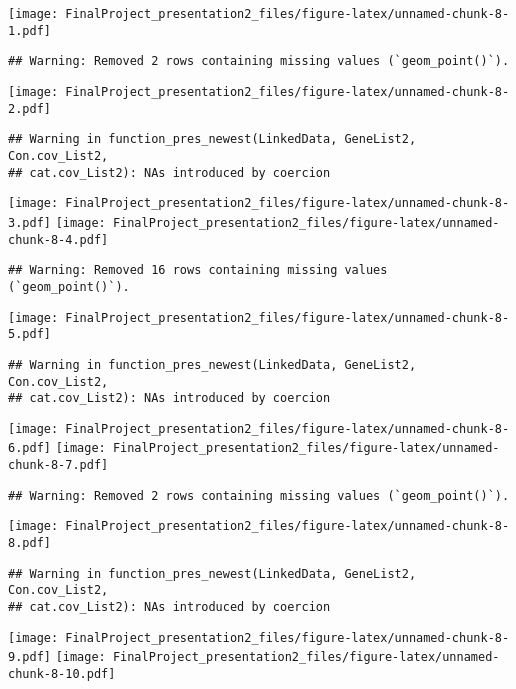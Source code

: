 \documentclass[
]{article}
\begin{document}
\texttt{[image: FinalProject\_presentation2\_files/figure-latex/unnamed-chunk-8-1.pdf]}

\begin{verbatim}
## Warning: Removed 2 rows containing missing values (`geom_point()`).
\end{verbatim}

\texttt{[image: FinalProject\_presentation2\_files/figure-latex/unnamed-chunk-8-2.pdf]}

\begin{verbatim}
## Warning in function_pres_newest(LinkedData, GeneList2, Con.cov_List2,
## cat.cov_List2): NAs introduced by coercion
\end{verbatim}

\texttt{[image: FinalProject\_presentation2\_files/figure-latex/unnamed-chunk-8-3.pdf]}
\texttt{[image: FinalProject\_presentation2\_files/figure-latex/unnamed-chunk-8-4.pdf]}

\begin{verbatim}
## Warning: Removed 16 rows containing missing values (`geom_point()`).
\end{verbatim}

\texttt{[image: FinalProject\_presentation2\_files/figure-latex/unnamed-chunk-8-5.pdf]}

\begin{verbatim}
## Warning in function_pres_newest(LinkedData, GeneList2, Con.cov_List2,
## cat.cov_List2): NAs introduced by coercion
\end{verbatim}

\texttt{[image: FinalProject\_presentation2\_files/figure-latex/unnamed-chunk-8-6.pdf]}
\texttt{[image: FinalProject\_presentation2\_files/figure-latex/unnamed-chunk-8-7.pdf]}

\begin{verbatim}
## Warning: Removed 2 rows containing missing values (`geom_point()`).
\end{verbatim}

\texttt{[image: FinalProject\_presentation2\_files/figure-latex/unnamed-chunk-8-8.pdf]}

\begin{verbatim}
## Warning in function_pres_newest(LinkedData, GeneList2, Con.cov_List2,
## cat.cov_List2): NAs introduced by coercion
\end{verbatim}

\texttt{[image: FinalProject\_presentation2\_files/figure-latex/unnamed-chunk-8-9.pdf]}
\texttt{[image: FinalProject\_presentation2\_files/figure-latex/unnamed-chunk-8-10.pdf]}
\end{document}
